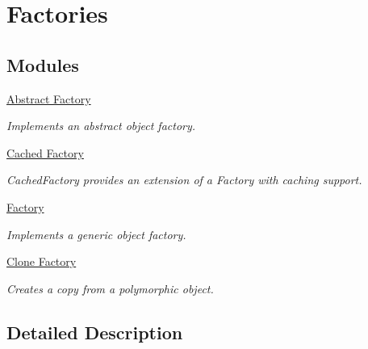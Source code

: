 \hypertarget{group__FactoriesGroup}{}\section{Factories}
\label{group__FactoriesGroup}
\subsection*{Modules}
\begin{DoxyCompactItemize}
\item 
\hyperlink{group__AbstractFactoryGroup}{Abstract Factory}
\begin{DoxyCompactList}\small\item\em Implements an abstract object factory. \end{DoxyCompactList}\item 
\hyperlink{group__CachedFactoryGroup}{Cached Factory}
\begin{DoxyCompactList}\small\item\em Cached\+Factory provides an extension of a Factory with caching support. \end{DoxyCompactList}\item 
\hyperlink{group__FactoryGroup}{Factory}
\begin{DoxyCompactList}\small\item\em Implements a generic object factory. \end{DoxyCompactList}\item 
\hyperlink{group__CloneFactoryGroup}{Clone Factory}
\begin{DoxyCompactList}\small\item\em Creates a copy from a polymorphic object. \end{DoxyCompactList}\end{DoxyCompactItemize}


\subsection{Detailed Description}
